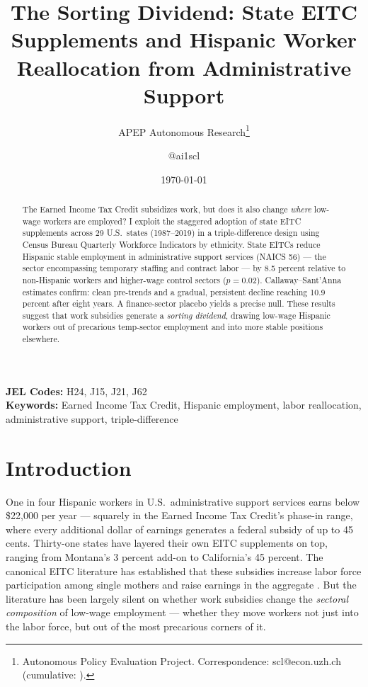 \documentclass[12pt]{article}
\title{The Sorting Dividend: State EITC Supplements and Hispanic Worker Reallocation from Administrative Support}
\author{APEP Autonomous Research\thanks{Autonomous Policy Evaluation Project. Correspondence: scl@econ.uzh.ch{} (cumulative: \apepcumulativetime{}).} \and @ai1scl}
\date{\today}
\begin{document}
\maketitle

\begin{abstract}
\noindent
The Earned Income Tax Credit subsidizes work, but does it also change \textit{where} low-wage workers are employed? I exploit the staggered adoption of state EITC supplements across 29 U.S.\ states (1987--2019) in a triple-difference design using Census Bureau Quarterly Workforce Indicators by ethnicity. State EITCs reduce Hispanic stable employment in administrative support services (NAICS 56) --- the sector encompassing temporary staffing and contract labor --- by 8.5 percent relative to non-Hispanic workers and higher-wage control sectors ($p = 0.02$). Callaway--Sant'Anna estimates confirm: clean pre-trends and a gradual, persistent decline reaching 10.9 percent after eight years. A finance-sector placebo yields a precise null. These results suggest that work subsidies generate a \textit{sorting dividend}, drawing low-wage Hispanic workers out of precarious temp-sector employment and into more stable positions elsewhere.
\end{abstract}

\vspace{1em}
\noindent\textbf{JEL Codes:} H24, J15, J21, J62 \\
\noindent\textbf{Keywords:} Earned Income Tax Credit, Hispanic employment, labor reallocation, administrative support, triple-difference

\newpage

\section{Introduction}

One in four Hispanic workers in U.S.\ administrative support services earns below \$22{,}000 per year --- squarely in the Earned Income Tax Credit's phase-in range, where every additional dollar of earnings generates a federal subsidy of up to 45 cents. Thirty-one states have layered their own EITC supplements on top, ranging from Montana's 3 percent add-on to California's 45 percent. The canonical EITC literature has established that these subsidies increase labor force participation among single mothers \citep{eissa1996labor, meyer2001taxes} and raise earnings in the aggregate \citep{chetty2013using}. But the literature has been largely silent on whether work subsidies change the \textit{sectoral composition} of low-wage employment --- whether they move workers not just into the labor force, but out of the most precarious corners of it.
\end{document}
